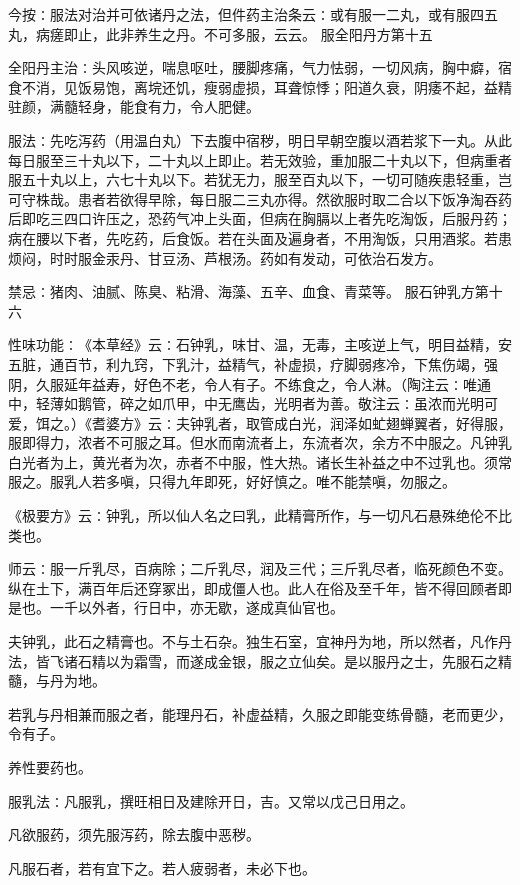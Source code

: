 \documentclass[a4paper,12pt,UTF8,twoside]{ctexbook}
\begin{document}
今按∶服法对治并可依诸丹之法，但件药主治条云∶或有服一二丸，或有服四五丸，病瘥即止，此非养生之丹。不可多服，云云。
服全阳丹方第十五

全阳丹主治∶头风咳逆，喘息呕吐，腰脚疼痛，气力怯弱，一切风病，胸中癖，宿食不消，见饭易饱，离垸还饥，瘦弱虚损，耳聋惊悸；阳道久衰，阴痿不起，益精驻颜，满髓轻身，能食有力，令人肥健。

服法∶先吃泻药（用温白丸）下去腹中宿秽，明日早朝空腹以酒若浆下一丸。从此每日服至三十丸以下，二十丸以上即止。若无效验，重加服二十丸以下，但病重者服五十丸以上，六七十丸以下。若犹无力，服至百丸以下，一切可随疾患轻重，岂可守株哉。患者若欲得早除，每日服二三丸亦得。然欲服时取二合以下饭净淘吞药后即吃三四口许压之，恐药气冲上头面，但病在胸膈以上者先吃淘饭，后服丹药；病在腰以下者，先吃药，后食饭。若在头面及遍身者，不用淘饭，只用酒浆。若患烦闷，时时服金汞丹、甘豆汤、芦根汤。药如有发动，可依治石发方。

禁忌∶猪肉、油腻、陈臭、粘滑、海藻、五辛、血食、青菜等。
服石钟乳方第十六

性味功能∶《本草经》云∶石钟乳，味甘、温，无毒，主咳逆上气，明目益精，安五脏，通百节，利九窍，下乳汁，益精气，补虚损，疗脚弱疼冷，下焦伤竭，强阴，久服延年益寿，好色不老，令人有子。不练食之，令人淋。（陶注云∶唯通中，轻薄如鹅管，碎之如爪甲，中无鹰齿，光明者为善。敬注云∶虽浓而光明可爱，饵之。）《耆婆方》云∶夫钟乳者，取管成白光，润泽如虻翅蝉翼者，好得服，服即得力，浓者不可服之耳。但水而南流者上，东流者次，余方不中服之。凡钟乳白光者为上，黄光者为次，赤者不中服，性大热。诸长生补益之中不过乳也。须常服之。服乳人若多嗔，只得九年即死，好好慎之。唯不能禁嗔，勿服之。

《极要方》云∶钟乳，所以仙人名之曰乳，此精膏所作，与一切凡石悬殊绝伦不比类也。

师云∶服一斤乳尽，百病除；二斤乳尽，润及三代；三斤乳尽者，临死颜色不变。纵在土下，满百年后还穿冢出，即成僵人也。此人在俗及至千年，皆不得回顾者即是也。一千以外者，行日中，亦无歇，遂成真仙官也。

夫钟乳，此石之精膏也。不与土石杂。独生石室，宜神丹为地，所以然者，凡作丹法，皆飞诸石精以为霜雪，而遂成金银，服之立仙矣。是以服丹之士，先服石之精髓，与丹为地。

若乳与丹相兼而服之者，能理丹石，补虚益精，久服之即能变练骨髓，老而更少，令有子。

养性要药也。

服乳法∶凡服乳，撰旺相日及建除开日，吉。又常以戊己日用之。

凡欲服药，须先服泻药，除去腹中恶秽。

凡服石者，若有宜下之。若人疲弱者，未必下也。
\end{document}
